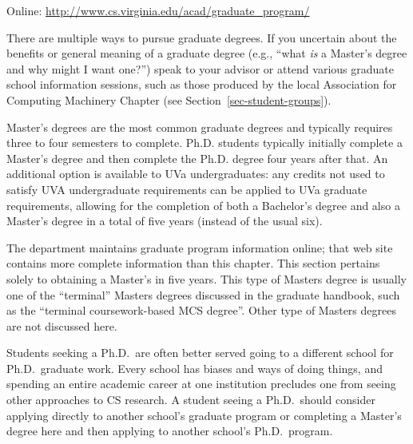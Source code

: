 \noindent Online: \url{http://www.cs.virginia.edu/acad/graduate_program/}





There are multiple ways to pursue graduate degrees. If you uncertain about
the benefits or general meaning of a graduate degree (e.g., ``what
\emph{is} a Master's degree and why might I want one?'') speak to your
advisor or attend various graduate school information sessions, such as
those produced by the local Association for Computing Machinery Chapter
(see Section~\ref{sec-student-groups}). 

Master's degrees are the most common graduate degrees and typically
requires three to four semesters to complete. Ph.D. students typically
initially complete a Master's degree and then complete the Ph.D. degree
four years after that. An additional option is available to UVa
undergraduates: any credits not used to satisfy UVA undergraduate
requirements can be applied to UVa graduate requirements, allowing for the
completion of both a Bachelor's degree and also a Master's degree in a
total of five years (instead of the usual six). 

The department maintains graduate program information
online; that
web site contains more complete information than this chapter.  This
section pertains solely to obtaining a Master's in five years. This type
of Masters degree is usually one of the ``terminal'' Masters degrees
discussed in the graduate handbook, such as the ``terminal coursework-based
MCS degree''. Other type of Masters degrees are not discussed here.

Students seeking a Ph.D.\ are often better served going to a different
school for Ph.D.\ graduate work. Every school has biases and ways of doing
things, and spending an entire academic career at one institution precludes
one from seeing other approaches to CS research. A student seeing a 
Ph.D.\ should consider applying directly to another school's graduate
program or completing a Master's degree here and then applying to another
school's Ph.D.\ program. 

